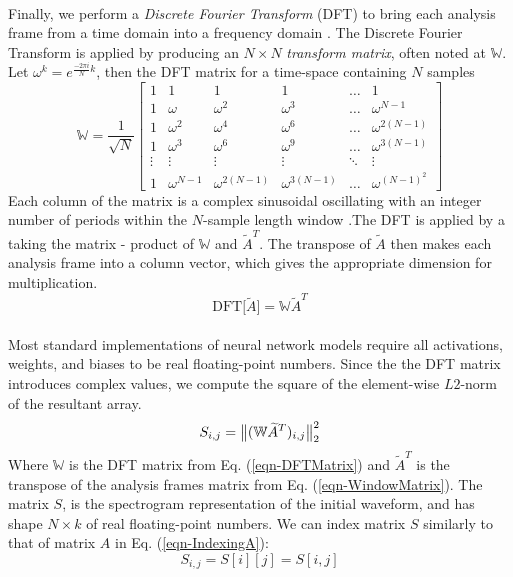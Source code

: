 \documentclass[12pt,letterpaper]{article}
\begin{document}
\paragraph*{}Finally, we perform a \textit{Discrete Fourier Transform} (DFT) to bring each analysis frame from a time domain into a frequency domain \cite{Olson,Peatross}. The Discrete Fourier Transform is applied by producing an $N \times N$ \textit{transform matrix}, often noted at $\mathbb{W}$. Let $\omega^k = e^{\frac{-2\pi i}{N}k}$, then the DFT matrix for a time-space containing $N$ samples
\begin{equation}
\label{eqn-DFTMatrix}
\mathbb{W} = \frac{1}{\sqrt{N}}
\begin{bmatrix}
1 & 1 & 1 & 1 & \hdots & 1 \\
1 & \omega		& \omega^2 & \omega^3 & \hdots & \omega^{N-1} \\
1 & \omega^2	& \omega^4 & \omega^6 & \hdots & \omega^{2(N-1)} \\
1 & \omega^3	& \omega^6 & \omega^9 & \hdots & \omega^{3(N-1)} \\
\vdots & \vdots & \vdots & \vdots & \ddots & \vdots \\
1 & \omega^{N-1} & \omega^{2(N-1)} & \omega^{3(N-1)} & \hdots & \omega^{(N-1)^2}
\end{bmatrix}
\end{equation}
Each column of the matrix is a complex sinusoidal oscillating with an integer number of periods within the $N$-sample length window \cite{Short,Peatross}.The DFT is applied by a taking the matrix - product of $\mathbb{W}$ and $\widetilde{A}^T$. The transpose of $\widetilde{A}$ then makes each analysis frame into a column vector, which gives the appropriate dimension for multiplication.
\begin{equation}
\label{eqn-DFT}
\text{DFT}\big[ \widetilde{A} \big] = \mathbb{W}\widetilde{A}^T
\end{equation}

\paragraph*{}Most standard implementations of neural network models require all activations, weights, and biases to be real floating-point numbers. Since the the DFT matrix introduces complex values, we compute the square of the element-wise $L2$-norm of the resultant array.
\begin{equation}
\label{eqn-Spectrogram}
S_{i,j} = \big{\lVert} (\mathbb{W}\widetilde{A}^T)_{i,j} \big{\rVert}_{2}^{2}
\end{equation}
Where $\mathbb{W}$ is the DFT matrix from Eq. (\ref{eqn-DFTMatrix}) and $\widetilde{A}^T$ is the transpose of the analysis frames matrix from Eq. (\ref{eqn-WindowMatrix}). The matrix $S$, is the spectrogram representation of the initial waveform, and has shape $N \times k$ of real floating-point numbers. We can index matrix $S$ similarly to that of matrix $A$ in Eq. (\ref{eqn-IndexingA}):
\begin{equation}
\label{eqn-IndexingS}
S_{i,j} = S[i][j] = S[i,j]
\end{equation}
\end{document}

